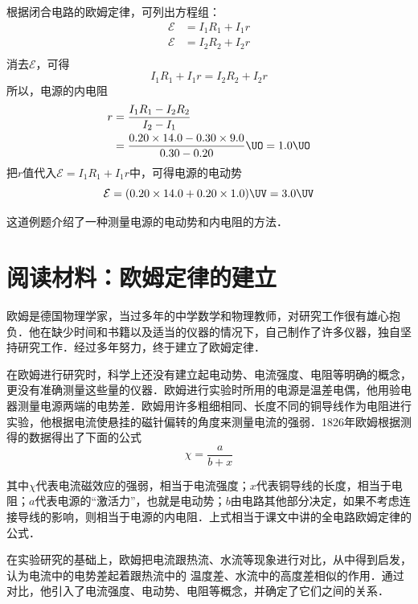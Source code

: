 \begin{solution}
    根据闭合电路的欧姆定律，可列出方程组：
    \[\begin{split}
        \mathcal{E}&=I_1R_1+I_1r\\
        \mathcal{E}&=I_2R_2+I_2r\\
    \end{split}\]
    消去$\mathcal{E}$，可得
    \[I_1 R_1+I_1r=I_2R_2+I_2r\]
    所以，电源的内电阻
\[\begin{split}
    r&=\frac{I_1R_1-I_2R_2}{I_2-I_1}\\
    &=\frac{0.20\times 14.0-0.30\times 9.0}{0.30-0.20} \UO =1.0\UO
\end{split}\]
    把$r$值代入$\mathcal{E}=I_1R_1+I_1r$中，可得电源的电动势
    \[\mathcal{E}=(0.20\times 14.0 +0.20\times 1.0) \UV =3.0 \UV \]
\end{solution}

这道例题介绍了一种测量电源的电动势和内电阻的方法．


\section*{阅读材料：欧姆定律的建立}

欧姆是德国物理学家，当过多年的中学数学和物理教师，对研究工作很有雄心抱负．他在缺少时间和书籍以及适当的仪器的情况下，自己制作了许多仪器，独自坚持研究工作．经过多年努力，终于建立了欧姆定律．

在欧姆进行研究时，科学上还没有建立起电动势、电流强度、电阻等明确的概念，更没有准确测量这些量的仪器．欧姆进行实验时所用的电源是温差电偶，他用验电器测量电源两端的电势差．欧姆用许多粗细相同、长度不同的铜导线作为电阻进行实验，他根据电流使悬挂的磁针偏转的角度来测量电流的强弱．1826年欧姆根据测得的数据得出了下面的公式
\[\chi=\frac{a}{b+x}\]

其中$\chi$代表电流磁效应的强弱，相当于电流强度；$x$代表铜导线的长度，相当于电阻；$a$代表电源的“激活力”，也就是电动势；$b$由电路其他部分决定，如果不考虑连接导线的影响，则相当于电源的内电阻．上式相当于课文中讲的全电路欧姆定律的公式．

在实验研究的基础上，欧姆把电流跟热流、水流等现象进行对比，从中得到启发，认为电流中的电势差起着跟热流中的
温度差、水流中的高度差相似的作用．通过对比，他引入了电流强度、电动势、电阻等概念，并确定了它们之间的关系．


